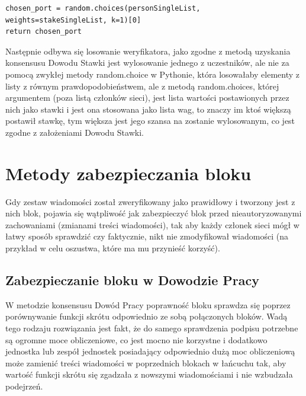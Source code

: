\begin{lstlisting}
chosen_port = random.choices(personSingleList, 
weights=stakeSingleList, k=1)[0]
return chosen_port
\end{lstlisting}

Następnie odbywa się losowanie weryfikatora, jako zgodne z metodą uzyskania konsensusu Dowodu Stawki jest wylosowanie jednego z uczestników, ale nie za pomocą zwykłej metody random.choice w Pythonie, która losowałaby elementy z listy z równym prawdopodobieństwem, ale z metodą random.choices, której argumentem (poza listą członków sieci), jest lista wartości postawionych przez nich jako stawki i jest ona stosowana jako lista wag, to znaczy im ktoś większą postawił stawkę, tym większa jest jego szansa na zostanie wylosowanym, co jest zgodne z założeniami Dowodu Stawki.

\section{Metody zabezpieczania bloku}

Gdy zestaw wiadomości został zweryfikowany jako prawidłowy i tworzony jest z nich blok, pojawia się wątpliwość jak zabezpieczyć blok przed nieautoryzowanymi zachowaniami  (zmianami treści wiadomości), tak aby każdy członek sieci mógł w łatwy sposób sprawdzić czy faktycznie, nikt nie zmodyfikował wiadomości (na przykład w celu oszustwa, które ma mu przynieść korzyść).

\subsection{Zabezpieczanie bloku w Dowodzie Pracy}

W metodzie konsensusu Dowód Pracy poprawność bloku sprawdza się poprzez porównywanie funkcji skrótu odpowiednio ze sobą połączonych bloków. Wadą tego rodzaju rozwiązania jest fakt, że do samego sprawdzenia podpisu potrzebne są ogromne moce obliczeniowe, co jest mocno nie korzystne i dodatkowo jednostka lub zespół jednostek posiadający odpowiednio dużą moc obliczeniową może zamienić treści wiadomości w poprzednich blokach w łańcuchu tak, aby wartość funkcji skrótu się zgadzała z nowszymi wiadomościami i nie wzbudzała podejrzeń.

\vspace{0.3\baselineskip}

